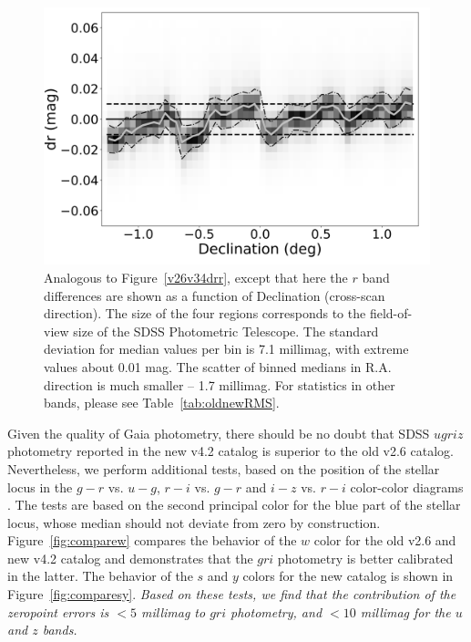 \documentclass[fleqn,usenatbib]{mnras}
\begin{document}
\begin{figure}
    \centering\includegraphics[width=0.95\columnwidth]{figures/testV26vsV42_r_dr_Dec_Hess.png} 
\caption{Analogous to Figure~\ref{v26v34drr}, except that here the $r$ band
differences are shown as a function of Declination (cross-scan direction). The size 
of the four regions corresponds to the field-of-view size of the SDSS Photometric Telescope. 
The standard deviation for median values per bin is 7.1 millimag, with extreme values about 
0.01 mag. The scatter of binned medians in R.A. direction is much smaller -- 1.7 millimag. 
For statistics in other bands, please see Table~\ref{tab:oldnewRMS}.}
\label{fig:v26v34drDec}
\end{figure}
 

Given the quality of Gaia photometry, there should be no doubt that SDSS $ugriz$ photometry
reported in the new v4.2 catalog is superior to the old v2.6 catalog. Nevertheless, we perform
additional tests, based on the position of the stellar locus in the $g-r$ vs. $u-g$, $r-i$ vs. $g-r$ 
and $i-z$ vs. $r-i$ color-color diagrams  \citep{2004AN....325..583I}. The tests are based
on the second principal color for the blue part of the stellar locus, whose median should 
not deviate from zero by construction. Figure~\ref{fig:comparew} compares the behavior
of the $w$ color for the old v2.6 and new v4.2 catalog and demonstrates that the $gri$
photometry is better calibrated in the latter. The behavior of the $s$ and $y$ colors for the 
new catalog is shown in Figure~\ref{fig:comparesy}. {\it Based on these tests, we find that 
the contribution of the zeropoint errors is $<5$ millimag to $gri$ photometry, and 
$<10$ millimag for the $u$ and $z$ bands.} 
\end{document}
